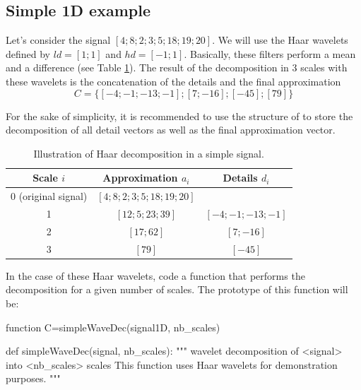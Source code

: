 \subsection{Simple 1D example}
Let's consider the signal $[ 4; 8; 2; 3; 5; 18; 19; 20]$. We will use the Haar wavelets defined by $ld=[1; 1]$ and $hd=[-1;1]$. Basically, 
these filters perform a mean and a difference (see Table \ref{tab:wavelets:decomposition}). The result of the decomposition in 3 scales with 
these wavelets is the concatenation of the details and the final approximation 
$$C=\{[-4    ;-1  ; -13  ;  -1]; [7 ;  -16]; [-45]; [ 79] \}$$

\begin{mcomment}
\begin{mremark}
For the sake of simplicity, it is recommended to use the structure  of \matlabregistered{} to store the decomposition of all detail 
vectors as well as the final approximation vector.
\end{mremark}
\end{mcomment}

\begin{table}[H]
\begin{center}
\begin{tabular}{|c|c|c|}
\hline
Scale $i$& Approximation $a_i$ & Details $d_i$\\ \hline
0 (original signal)&  $[ 4; 8; 2; 3; 5; 18; 19; 20]$& \\
1& $[12 ;    5 ;   23 ;   39 ]$& $[-4;-1;-13;-1]$\\
2 & $[17; 62]$ & $[7 ;-16]$\\
3 & $[79]$& $[-45]$\\
\hline
\end{tabular}
\end{center}
\caption{Illustration of Haar decomposition in a simple signal.\label{tab:wavelets:decomposition}}
\end{table}

\begin{qbox}
In the case of these Haar wavelets, code a function that performs the decomposition for a given number of scales. The prototype of this 
function will be:

\begin{mcomment}
\begin{matlab} 
function C=simpleWaveDec(signal1D, nb_scales)
\end{matlab}
\end{mcomment}


\begin{pcomment}
\begin{python}
def simpleWaveDec(signal, nb_scales):
    """
    wavelet decomposition of <signal> into <nb_scales> scales
    This function uses Haar wavelets for demonstration purposes.
    """
\end{python}
\end{pcomment}

\end{qbox}

